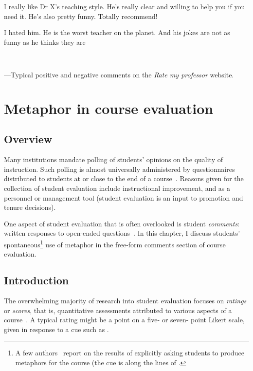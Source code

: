 \begin{singlespace}
\begin{savequote}[105mm]
  \begin{minipage}[t]{.45\textwidth}\raggedright
    I really like Dr X's teaching style.  He's really clear and
willing to help you if you need it.  He's also pretty funny.  Totally
recommend!\end{minipage}\hfill\begin{minipage}[t]{.45\textwidth}\raggedright
    I hated him.  He is the worst teacher on the planet.
And his jokes are not as funny as he thinks they are
\end{minipage}\\ \rule{0mm}{8mm}---Typical
positive and negative comments on the \emph{Rate my professor}
website.
\end{savequote}
\end{singlespace}

\chapter{Metaphor in course evaluation}
\label{chapter7}

\section{Overview}

Many institutions mandate polling of students' opinions on the quality
of instruction.  Such polling is almost universally administered by
questionnaires distributed to students at or close to the end of a
course~\citep{wachtel1998}.  Reasons given for the collection of
student evaluation include instructional improvement, and as a
personnel or management tool (student evaluation is an input to
promotion and tenure decisions).

One aspect of student evaluation that is often overlooked is student
\emph{comments}: written responses to open-ended
questions~\citep{stewart2015}.  In this chapter, I discuss students'
spontaneous\footnote{A few authors~\parencite{kemp1999,starrglass2005}
  report on the results of explicitly asking students to produce
  metaphors for the course (the cue is along the lines of .} use of metaphor
in the free-form comments section of course evaluation.

\section{Introduction}
The overwhelming majority of research into student evaluation focuses
on \emph{ratings} or \emph{scores}, that is, quantitative assessments
attributed to various aspects of a course~\citep{stewart2015}.  A
typical rating might be a point on a five- or seven- point Likert
scale, given in response to a cue such as .


